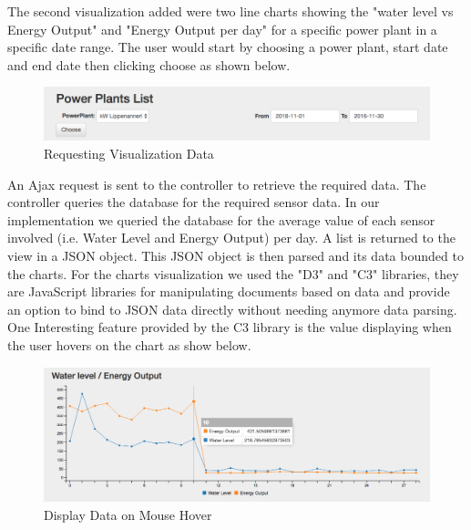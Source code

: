 The second visualization added were two line charts showing the "water level vs Energy Output" and "Energy Output per day" for a specific power plant in a specific date range. The user would start by choosing a power plant, start date and end date then clicking choose as shown below.
\begin{figure}[H]
\centering
\includegraphics[scale=0.5]{Images/ChooseVis.png}
\caption[Requesting Visualization Data]{Requesting Visualization Data}
\end{figure}
An Ajax request is sent to the controller to retrieve the required data. The controller queries the database for the required sensor data. In our implementation we queried the database for the average value of each sensor involved (i.e. Water Level and Energy Output) per day. A list is returned to the view in a JSON object. This JSON object is then parsed and its data bounded to the charts. For the charts visualization we used the "D3" and "C3" libraries, they are JavaScript libraries for manipulating documents based on data and provide an option to bind to JSON data directly without needing anymore data parsing. One Interesting feature provided by the C3 library is the value displaying when the user hovers on the chart as show below.
\begin{figure}[H]
\centering
\includegraphics[scale=0.45]{Images/MouseHover.png}
\caption[Display Data on Mouse Hover]{Display Data on Mouse Hover}
\end{figure}